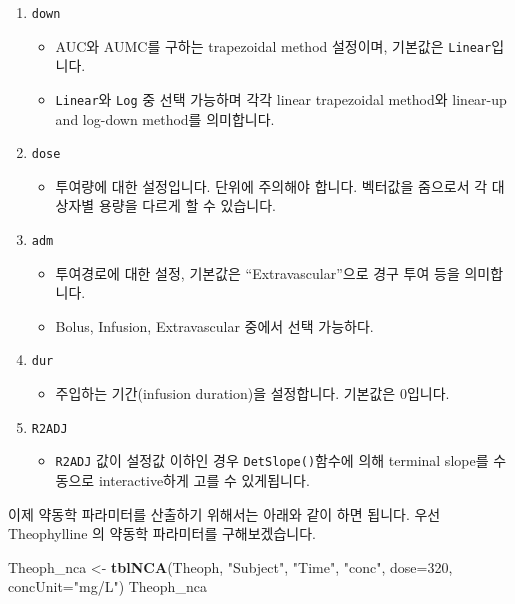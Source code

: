 \documentclass[
  10pt,
]{krantz}
\makeatletter
\newenvironment{Shaded}{\begin{snugshade}}{\end{snugshade}}
\newcommand{\DataTypeTok}[1]{\textcolor[rgb]{0.13,0.29,0.53}{#1}}
\newcommand{\DecValTok}[1]{\textcolor[rgb]{0.00,0.00,0.81}{#1}}
\newcommand{\KeywordTok}[1]{\textcolor[rgb]{0.13,0.29,0.53}{\textbf{#1}}}
\newcommand{\NormalTok}[1]{#1}
\newcommand{\StringTok}[1]{\textcolor[rgb]{0.31,0.60,0.02}{#1}}
\providecommand{\tightlist}{%
  \setlength{\itemsep}{0pt}\setlength{\parskip}{0pt}}
\newenvironment{kframe}{%
\medskip{}
\setlength{\fboxsep}{.8em}
 \def\at@end@of@kframe{}%
 \ifinner\ifhmode%
  \def\at@end@of@kframe{\end{minipage}}%
  \begin{minipage}{\columnwidth}%
 \fi\fi%
 \def\FrameCommand##1{\hskip\@totalleftmargin \hskip-\fboxsep
 \colorbox{shadecolor}{##1}\hskip-\fboxsep
     \hskip-\linewidth \hskip-\@totalleftmargin \hskip\columnwidth}%
 \MakeFramed {\advance\hsize-\width
   \@totalleftmargin\z@ \linewidth\hsize
   \@setminipage}}%
 {\par\unskip\endMakeFramed%
 \at@end@of@kframe}
\renewenvironment{Shaded}{\begin{kframe}}{\end{kframe}}
\makeatother
\begin{document}
\begin{enumerate}
\def\labelenumi{\arabic{enumi}.}
\tightlist
\item
  \texttt{down}

  \begin{itemize}
  \tightlist
  \item
    AUC와 AUMC를 구하는 trapezoidal method 설정이며, 기본값은 \texttt{Linear}입니다.
  \item
    \texttt{Linear}와 \texttt{Log} 중 선택 가능하며 각각 linear trapezoidal method와 linear-up and log-down method를 의미합니다.
  \end{itemize}
\item
  \texttt{dose}

  \begin{itemize}
  \tightlist
  \item
    투여량에 대한 설정입니다. 단위에 주의해야 합니다. 벡터값을 줌으로서 각 대상자별 용량을 다르게 할 수 있습니다.
  \end{itemize}
\item
  \texttt{adm}

  \begin{itemize}
  \tightlist
  \item
    투여경로에 대한 설정, 기본값은 ``Extravascular''으로 경구 투여 등을 의미합니다.
  \item
    Bolus, Infusion, Extravascular 중에서 선택 가능하다.
  \end{itemize}
\item
  \texttt{dur}

  \begin{itemize}
  \tightlist
  \item
    주입하는 기간(infusion duration)을 설정합니다. 기본값은 0입니다.
  \end{itemize}
\item
  \texttt{R2ADJ}

  \begin{itemize}
  \tightlist
  \item
    \texttt{R2ADJ} 값이 설정값 이하인 경우 \texttt{DetSlope()}함수에 의해 terminal slope를 수동으로 interactive하게 고를 수 있게됩니다.
  \end{itemize}
\end{enumerate}

이제 약동학 파라미터를 산출하기 위해서는 아래와 같이 하면 됩니다.
우선 Theophylline 의 약동학 파라미터를 구해보겠습니다.

\begin{Shaded}
\begin{Highlighting}[]
\NormalTok{Theoph\_nca \textless{}{-}}\StringTok{ }\KeywordTok{tblNCA}\NormalTok{(Theoph, }\StringTok{"Subject"}\NormalTok{, }\StringTok{"Time"}\NormalTok{, }\StringTok{"conc"}\NormalTok{, }
                     \DataTypeTok{dose=}\DecValTok{320}\NormalTok{, }\DataTypeTok{concUnit=}\StringTok{"mg/L"}\NormalTok{)}
\NormalTok{Theoph\_nca}
\end{Highlighting}
\end{Shaded}
\end{document}
